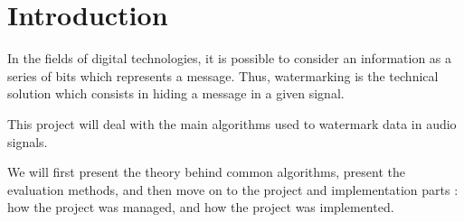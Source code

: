 \chapter*{Introduction}
In the fields of digital technologies, it is possible to consider an information as a series of bits which represents a message. Thus, watermarking is the technical solution which consists in hiding a message in a given signal. 

This project will deal with the main algorithms used to watermark data in audio signals.

We will first present the theory behind common algorithms, present the evaluation methods, and then move on to the project and implementation parts : how the project was managed, and how the project was implemented.